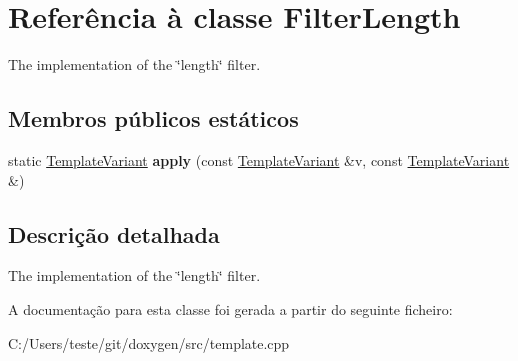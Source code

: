 \hypertarget{class_filter_length}{\section{Referência à classe Filter\-Length}
\label{class_filter_length}
}


The implementation of the \char`\"{}length\char`\"{} filter.  


\subsection*{Membros públicos estáticos}
\begin{DoxyCompactItemize}
\item 
\hypertarget{class_filter_length_ab7b829ea4352fa331a604fe7ea3e89c8}{static \hyperlink{class_template_variant}{Template\-Variant} {\bfseries apply} (const \hyperlink{class_template_variant}{Template\-Variant} \&v, const \hyperlink{class_template_variant}{Template\-Variant} \&)}\label{class_filter_length_ab7b829ea4352fa331a604fe7ea3e89c8}

\end{DoxyCompactItemize}


\subsection{Descrição detalhada}
The implementation of the \char`\"{}length\char`\"{} filter. 

A documentação para esta classe foi gerada a partir do seguinte ficheiro\-:\begin{DoxyCompactItemize}
\item 
C\-:/\-Users/teste/git/doxygen/src/template.\-cpp\end{DoxyCompactItemize}
